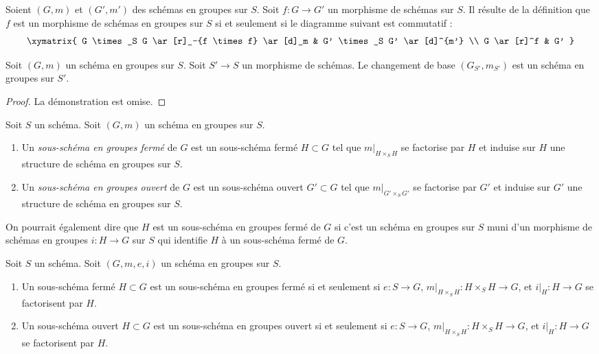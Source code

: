 \medskip\noindent
Soient $(G, m)$ et $(G', m')$ des schémas en groupes sur $S$.
Soit $f : G \to G'$ un morphisme de schémas sur $S$.
Il résulte de la définition que $f$ est un morphisme
de schémas en groupes sur $S$ si et seulement si le diagramme suivant
est commutatif :
$$
\xymatrix{
G \times_S G \ar[r]_-{f \times f} \ar[d]_m &
G' \times_S G' \ar[d]^{m'} \\
G \ar[r]^f & G'
}
$$

\begin{lemma}
\label{lemma-base-change-group-scheme}
Soit $(G, m)$ un schéma en groupes sur $S$.
Soit $S' \to S$ un morphisme de schémas.
Le changement de base $(G_{S'}, m_{S'})$ est un schéma en groupes sur $S'$.
\end{lemma}

\begin{proof}
La démonstration est omise.
\end{proof}

\begin{definition}
\label{definition-closed-subgroup-scheme}
Soit $S$ un schéma. Soit $(G, m)$ un schéma en groupes sur $S$.
\begin{enumerate}
\item Un {\it sous-schéma en groupes fermé} de $G$ est un sous-schéma fermé
$H \subset G$ tel que $m|_{H \times_S H}$ se factorise par $H$ et induise
sur $H$ une structure de schéma en groupes sur $S$.
\item Un {\it sous-schéma en groupes ouvert} de $G$ est un sous-schéma ouvert
$G' \subset G$ tel que $m|_{G' \times_S G'}$ se factorise par $G'$
et induise sur $G'$ une structure de schéma en groupes sur $S$.
\end{enumerate}
\end{definition}

\noindent
On pourrait également dire que $H$ est un sous-schéma en groupes fermé de $G$
si c'est un schéma en groupes sur $S$ muni d'un morphisme de schémas en groupes
$i : H \to G$ sur $S$ qui identifie $H$ à un sous-schéma fermé de $G$.

\begin{lemma}
\label{lemma-closed-subgroup-scheme}
Soit $S$ un schéma. Soit $(G, m, e, i)$ un schéma en groupes sur $S$.
\begin{enumerate}
\item Un sous-schéma fermé $H \subset G$ est un sous-schéma en groupes fermé
si et seulement si $e : S \to G$, $m|_{H \times_S H} : H \times_S H \to G$,
et $i|_H : H \to G$ se factorisent par $H$.
\item Un sous-schéma ouvert $H \subset G$ est un sous-schéma en groupes ouvert
si et seulement si $e : S \to G$, $m|_{H \times_S H} : H \times_S H \to G$,
et $i|_H : H \to G$ se factorisent par $H$.
\end{enumerate}
\end{lemma}

